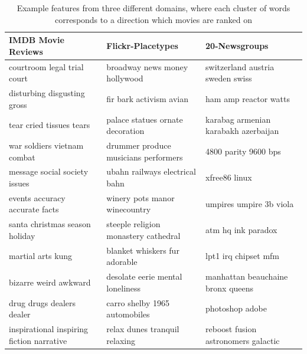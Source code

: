 \begin{table}[] 
	\scriptsize
	\begin{tabular}{lll}                                                                   
		\textbf{IMDB Movie Reviews}                                 & \textbf{Flickr-Placetypes}           & \textbf{20-Newsgroups}                           \\
		\toprule
		courtroom legal trial court                                 & broadway news money hollywood        & switzerland austria sweden swiss     \\
		disturbing disgusting gross                                 & fir bark activism avian              & ham amp reactor watts                \\
		tear cried tissues tears                                    & palace statues ornate decoration     & karabag armenian karabakh azerbaijan \\
		war soldiers vietnam combat                                 & drummer produce musicians performers & 4800 parity 9600 bps                 \\
		message social society issues                               & ubahn railways electrical bahn       & xfree86 linux                        \\
		events accuracy accurate facts                              & winery pots manor winecountry        & umpires umpire 3b viola              \\
		santa christmas season holiday                              & steeple religion monastery cathedral & atm hq ink paradox                   \\
		martial arts kung                                           & blanket whiskers fur adorable        & lpt1 irq chipset mfm                 \\
		bizarre weird awkward                                       & desolate eerie mental loneliness     & manhattan beauchaine bronx queens    \\
		drug drugs dealers dealer                                   & carro shelby 1965 automobiles        & photoshop adobe                      \\
		inspirational inspiring fiction narrative                   & relax dunes tranquil relaxing        & reboost fusion astronomers galactic 
	\end{tabular}  
	\caption{Example features from three different domains, where each cluster of words corresponds to a direction which movies are ranked on}\label{ch3:ExampleRep}    
\end{table}   


